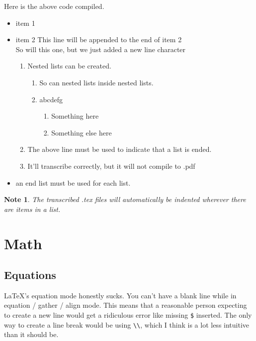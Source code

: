 \documentclass[12pt]{article}
\newtheorem{Note}[Lemma]{Note}
\begin{document}
\begin{flushleft}
\bigskip

Here is the above code compiled. \\

\begin{itemize}[label=--]
    \item item 1
    \item item 2
    This line will be appended to the end of item 2
    \\ So will this one, but we just added a new line character
    \begin{enumerate}[label=\alph*)]
        \item Nested lists can be created.
        \begin{enumerate}[label=(\roman*)]
            \item So can nested lists inside nested lists.
            \item abcdefg
            \begin{enumerate}[label=.\arabic*.]
                \item Something here
                \item Something else here
            \end{enumerate}
        \end{enumerate}
        \item The above line must be used to indicate that a list is ended.
        \item It'll transcribe correctly, but it will not compile to .pdf
    \end{enumerate}
    \item an end list must be used for each list.
\end{itemize}

\begin{Note}
The transcribed .tex files will automatically be indented wherever there are items in a list.
\end{Note}

\newpage

\section*{Math}

\subsection*{Equations}

LaTeX's equation mode honestly sucks. You can't have a blank line while in equation / gather / align mode. This means that a reasonable person expecting to create a new line would get a ridiculous error like missing \verb|$| inserted. The only way to create a line break would be using \verb|\\|, which I think is a lot less intuitive than it should be.


\end{flushleft}
\end{document}
